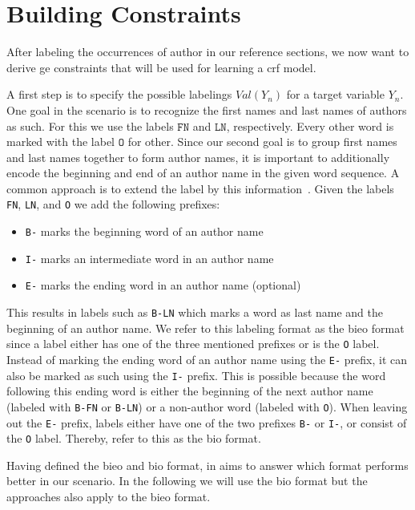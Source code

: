 \section{Building  Constraints}\label{sec:ae-training-crfs}

After labeling the occurrences of author in our reference sections, we now want to derive \gls{ge} constraints that will be used for learning a \gls{crf} model.

A first step is to specify the possible labelings $Val(Y_n)$ for a \gls{target variable} $Y_n$.
One goal in the scenario is to recognize the first names and last names of authors as such.
For this we use the labels $\texttt{FN}$ and $\texttt{LN}$, respectively.
Every other word is marked with the label $\texttt{O}$ for other.
Since our second goal is to group first names and last names together to form author names, it is important to additionally encode the beginning and end of an author name in the given word sequence.
A common approach is to extend the label by this information~\citep{houngbo2012method}.
Given the labels \texttt{FN}, \texttt{LN}, and \texttt{O} we add the following prefixes:
\begin{itemize}
  \item \texttt{B-} marks the beginning word of an author name
  \item \texttt{I-} marks an intermediate word in an author name
  \item \texttt{E-} marks the ending word in an author name (optional)
\end{itemize}
This results in labels such as \texttt{B-LN} which marks a word as last name and the beginning of an author name.
We refer to this labeling format as the \acrfull{bieo} format since a label either has one of the three mentioned prefixes or is the \texttt{O} label.
Instead of marking the ending word of an author name using the \texttt{E-} prefix, it can also be marked as such using the \texttt{I-} prefix.
This is possible because the word following this ending word is either the beginning of the next author name (labeled with \texttt{B-FN} or \texttt{B-LN}) or a non-author word (labeled with \texttt{O}).
When leaving out the \texttt{E-} prefix, labels either have one of the two prefixes \texttt{B-} or \texttt{I-}, or consist of the \texttt{O} label.
Thereby, \citet{houngbo2012method} refer to this as the \acrfull{bio} format.

Having defined the \gls{bieo} and \gls{bio} format,  in  aims to answer which format performs better in our scenario.
In the following we will use the \gls{bio} format but the approaches also apply to the \gls{bieo} format.

